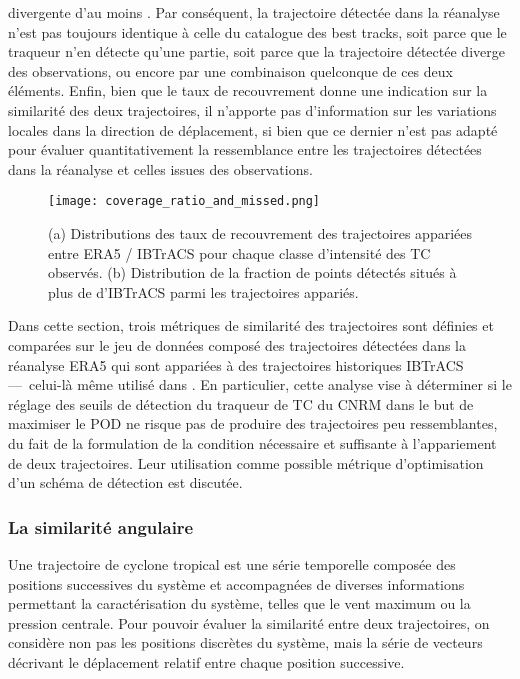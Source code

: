 \documentclass[../main.tex]{subfiles}
\begin{document}
divergente d'au moins . Par conséquent, la trajectoire détectée dans la réanalyse n'est pas toujours identique à celle du catalogue des best tracks,
soit parce que le traqueur n'en détecte qu'une partie, soit parce que la trajectoire détectée diverge des observations, ou encore par une combinaison quelconque
de ces deux éléments. Enfin, bien que le taux de recouvrement donne une indication sur la similarité des deux trajectoires, il n'apporte pas d'information sur
les variations locales dans la direction de déplacement, si bien que ce dernier n'est pas adapté pour évaluer quantitativement la ressemblance entre les
trajectoires détectées dans la réanalyse et celles issues des observations.

\begin{figure}[tb]
    \centering
    \texttt{[image: coverage\_ratio\_and\_missed.png]}
    \caption{(a) Distributions des taux de recouvrement des trajectoires appariées entre ERA5 / IBTrACS pour chaque classe d'intensité des TC observés. (b)
    Distribution de la fraction de points détectés situés à plus de  d'IBTrACS parmi les trajectoires appariés.}
    \label{fig:coverage_ratio}
\end{figure}

Dans cette section, trois métriques de similarité des trajectoires sont définies et comparées sur le jeu de données composé des trajectoires détectées dans la
réanalyse ERA5 qui sont appariées à des trajectoires historiques IBTrACS ---~celui-là même utilisé dans \cite{dulac_assessing_2023}. En particulier, cette
analyse vise à déterminer si le réglage des seuils de détection du traqueur de TC du CNRM dans le but de maximiser le POD ne risque pas de produire des
trajectoires peu ressemblantes, du fait de la formulation de la condition nécessaire et suffisante à l'appariement de deux trajectoires. Leur utilisation comme
possible métrique d'optimisation d'un schéma de détection est discutée.

\subsubsection*{La similarité angulaire}

Une trajectoire de cyclone tropical est une série temporelle composée des positions successives du système et accompagnées de diverses informations permettant la
caractérisation du système, telles que le vent maximum ou la pression centrale. Pour pouvoir évaluer la similarité entre deux trajectoires, on considère non pas
les positions discrètes du système, mais la série de vecteurs décrivant le déplacement relatif entre chaque position successive.
\end{document}
